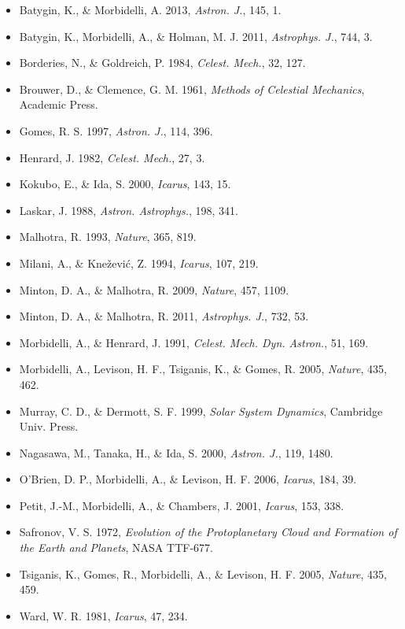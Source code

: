 \documentclass[11pt,a4paper]{article}
\begin{document}
\begin{itemize}
    \item Batygin, K., \& Morbidelli, A. 2013, \textit{Astron. J.}, 145, 1.
    \item Batygin, K., Morbidelli, A., \& Holman, M. J. 2011, \textit{Astrophys. J.}, 744, 3.
    \item Borderies, N., \& Goldreich, P. 1984, \textit{Celest. Mech.}, 32, 127.
    \item Brouwer, D., \& Clemence, G. M. 1961, \textit{Methods of Celestial Mechanics}, Academic Press.
    \item Gomes, R. S. 1997, \textit{Astron. J.}, 114, 396.
    \item Henrard, J. 1982, \textit{Celest. Mech.}, 27, 3.
    \item Kokubo, E., \& Ida, S. 2000, \textit{Icarus}, 143, 15.
    \item Laskar, J. 1988, \textit{Astron. Astrophys.}, 198, 341.
    \item Malhotra, R. 1993, \textit{Nature}, 365, 819.
    \item Milani, A., \& Kne{\v z}evi{\'c}, Z. 1994, \textit{Icarus}, 107, 219.
    \item Minton, D. A., \& Malhotra, R. 2009, \textit{Nature}, 457, 1109.
    \item Minton, D. A., \& Malhotra, R. 2011, \textit{Astrophys. J.}, 732, 53.
    \item Morbidelli, A., \& Henrard, J. 1991, \textit{Celest. Mech. Dyn. Astron.}, 51, 169.
    \item Morbidelli, A., Levison, H. F., Tsiganis, K., \& Gomes, R. 2005, \textit{Nature}, 435, 462.
    \item Murray, C. D., \& Dermott, S. F. 1999, \textit{Solar System Dynamics}, Cambridge Univ. Press.
    \item Nagasawa, M., Tanaka, H., \& Ida, S. 2000, \textit{Astron. J.}, 119, 1480.
    \item O'Brien, D. P., Morbidelli, A., \& Levison, H. F. 2006, \textit{Icarus}, 184, 39.
    \item Petit, J.-M., Morbidelli, A., \& Chambers, J. 2001, \textit{Icarus}, 153, 338.
    \item Safronov, V. S. 1972, \textit{Evolution of the Protoplanetary Cloud and Formation of the Earth and Planets}, NASA TTF-677.
    \item Tsiganis, K., Gomes, R., Morbidelli, A., \& Levison, H. F. 2005, \textit{Nature}, 435, 459.
    \item Ward, W. R. 1981, \textit{Icarus}, 47, 234.
\end{itemize}
\end{document}

